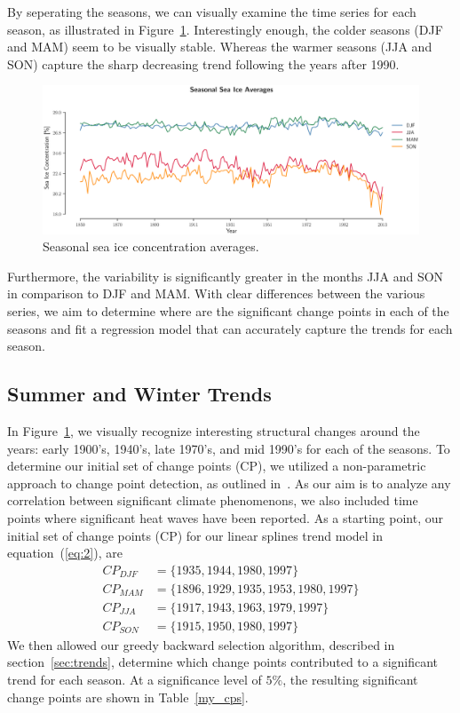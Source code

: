 \documentclass[12pt]{article}
\begin{document}
By seperating the seasons, we can visually examine the time series for each season, as illustrated in Figure~\ref{seasonal_avgs}. Interestingly enough, the colder seasons (DJF and MAM) seem to be visually stable. Whereas the warmer seasons (JJA and SON) capture the sharp decreasing trend following the years after 1990.
\begin{figure}[!htbp]
  \centering
  \includegraphics[width=1\textwidth,center]{figs/seasonal_avgs}
  \caption{Seasonal sea ice concentration averages.}\label{seasonal_avgs}
\end{figure}

Furthermore, the variability is significantly greater in the months JJA and SON in comparison to DJF and MAM. With clear differences between the various series, we aim to determine where are the significant change points in each of the seasons and fit a regression model that can accurately capture the trends for each season.


\subsection{Summer and Winter Trends}
In Figure~\ref{seasonal_avgs}, we visually recognize interesting structural changes around the years: early 1900's, 1940's, late 1970's, and mid 1990's for each of the seasons. To determine our initial set of change points (CP), we utilized a non-parametric approach to change point detection, as outlined in~\citep{cps}. As our aim is to analyze any correlation between significant climate phenomenons, we also included time points where significant heat waves have been reported. As a starting point, our initial set of change points (CP) for our linear splines trend model in equation~(\ref{eq:2}), are
\begin{align*}
CP_{DJF} &= \{1935, 1944, 1980, 1997\} \\
CP_{MAM} &= \{1896, 1929, 1935, 1953, 1980, 1997\} \\
CP_{JJA} &= \{1917, 1943, 1963,1979, 1997\} \\
CP_{SON} &= \{1915, 1950, 1980, 1997\}
\end{align*}
We then allowed our greedy backward selection algorithm, described in section~\ref{sec:trends}, determine which change points contributed to a significant trend for each season. At a significance level of $5\%$, the resulting significant change points are shown in Table~\ref{my_cps}.
\end{document}
